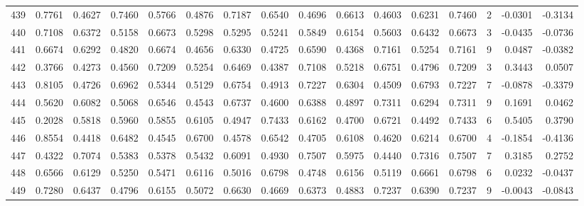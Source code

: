 \begin{tabular}{lrrrrrrrrrrrrrrr}
439 &      0.7761 &  0.4627 &  0.7460 &  0.5766 &  0.4876 &  0.7187 &  0.6540 &  0.4696 &  0.6613 &  0.4603 &   0.6231 &     0.7460 &      2 &                   -0.0301 &                    -0.3134 \\
440 &      0.7108 &  0.6372 &  0.5158 &  0.6673 &  0.5298 &  0.5295 &  0.5241 &  0.5849 &  0.6154 &  0.5603 &   0.6432 &     0.6673 &      3 &                   -0.0435 &                    -0.0736 \\
441 &      0.6674 &  0.6292 &  0.4820 &  0.6674 &  0.4656 &  0.6330 &  0.4725 &  0.6590 &  0.4368 &  0.7161 &   0.5254 &     0.7161 &      9 &                    0.0487 &                    -0.0382 \\
442 &      0.3766 &  0.4273 &  0.4560 &  0.7209 &  0.5254 &  0.6469 &  0.4387 &  0.7108 &  0.5218 &  0.6751 &   0.4796 &     0.7209 &      3 &                    0.3443 &                     0.0507 \\
443 &      0.8105 &  0.4726 &  0.6962 &  0.5344 &  0.5129 &  0.6754 &  0.4913 &  0.7227 &  0.6304 &  0.4509 &   0.6793 &     0.7227 &      7 &                   -0.0878 &                    -0.3379 \\
444 &      0.5620 &  0.6082 &  0.5068 &  0.6546 &  0.4543 &  0.6737 &  0.4600 &  0.6388 &  0.4897 &  0.7311 &   0.6294 &     0.7311 &      9 &                    0.1691 &                     0.0462 \\
445 &      0.2028 &  0.5818 &  0.5960 &  0.5855 &  0.6105 &  0.4947 &  0.7433 &  0.6162 &  0.4700 &  0.6721 &   0.4492 &     0.7433 &      6 &                    0.5405 &                     0.3790 \\
446 &      0.8554 &  0.4418 &  0.6482 &  0.4545 &  0.6700 &  0.4578 &  0.6542 &  0.4705 &  0.6108 &  0.4620 &   0.6214 &     0.6700 &      4 &                   -0.1854 &                    -0.4136 \\
447 &      0.4322 &  0.7074 &  0.5383 &  0.5378 &  0.5432 &  0.6091 &  0.4930 &  0.7507 &  0.5975 &  0.4440 &   0.7316 &     0.7507 &      7 &                    0.3185 &                     0.2752 \\
448 &      0.6566 &  0.6129 &  0.5250 &  0.5471 &  0.6116 &  0.5016 &  0.6798 &  0.4748 &  0.6156 &  0.5119 &   0.6661 &     0.6798 &      6 &                    0.0232 &                    -0.0437 \\
449 &      0.7280 &  0.6437 &  0.4796 &  0.6155 &  0.5072 &  0.6630 &  0.4669 &  0.6373 &  0.4883 &  0.7237 &   0.6390 &     0.7237 &      9 &                   -0.0043 &                    -0.0843 \\

\end{tabular}
